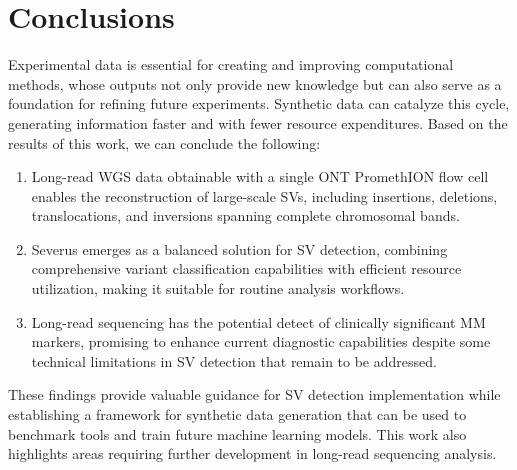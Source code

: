 \chapter{Conclusions}

Experimental data is essential for creating and improving computational methods, 
whose outputs not only provide new knowledge but can also serve as a foundation 
for refining future experiments. Synthetic data can catalyze this cycle, 
generating information faster and with fewer resource expenditures. Based on the 
results of this work, we can conclude the following:

\begin{enumerate}

    \item Long-read WGS data obtainable with a single ONT PromethION flow cell 
    enables the reconstruction of large-scale SVs, including insertions, deletions, 
    translocations, and inversions spanning complete chromosomal bands.
    
    \item Severus emerges as a balanced solution for SV detection, combining 
    comprehensive variant classification capabilities with efficient resource 
    utilization, making it suitable for routine analysis workflows.
    
    \item Long-read sequencing has the potential detect of clinically 
    significant MM markers, promising to enhance current diagnostic capabilities 
    despite some technical limitations in SV detection that remain to be addressed.

\end{enumerate}

These findings provide valuable guidance for SV detection implementation while 
establishing a framework for synthetic data generation that can be used to 
benchmark tools and train future machine learning models. This work also 
highlights areas requiring further development in long-read sequencing analysis.